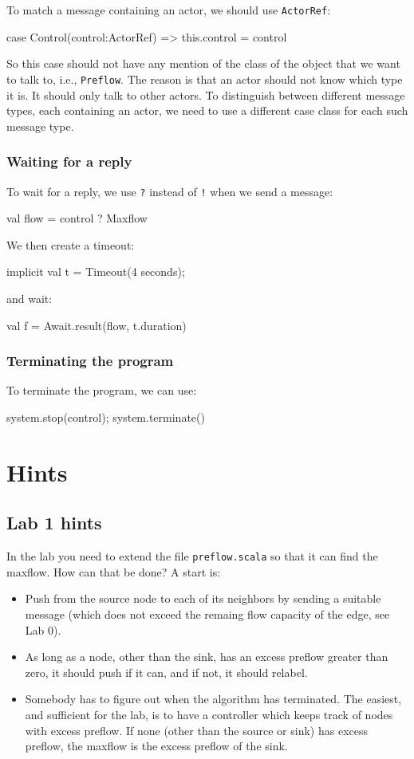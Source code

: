 \documentclass{forsete}
\begin{document}
To match a message containing an actor, we should use \verb.ActorRef.:

\begin{ccode}
case Control(control:ActorRef)	=> this.control = control
\end{ccode}
So this case should not have any mention of the class of the object that we want to talk to, i.e., {\tt Preflow}.
The reason is that an actor should not know which type it is. It should only talk to other actors.
To distinguish between different message types, each containing an actor, we need to use a 
different case class for each such message type.

\subsubsection*{Waiting for a reply}
To wait for a reply, we use \verb.?. instead of \verb.!. when we send a message:

\begin{ccode}
val flow = control ? Maxflow
\end{ccode}
We then create a timeout:
\begin{ccode}
implicit val t = Timeout(4 seconds);
\end{ccode}
and wait:
\begin{ccode}
val f = Await.result(flow, t.duration)
\end{ccode}
\subsubsection*{Terminating the program}
To terminate the program, we can use:
\begin{ccode}
system.stop(control);
system.terminate()
\end{ccode}

\section{Hints}
\subsection*{Lab 1 hints}
In the lab you need to extend the file \verb!preflow.scala! so that it can find the maxflow.
How can that be done? A start is:

\begin{itemize}
\item Push from the source node to each of its neighbors by sending a suitable message (which does not exceed
the remaing flow capacity of the edge, see Lab 0).
\item As long as a node, other than the sink, has an excess preflow greater than zero, it should 
push if it can, and if not, it should relabel.
\item Somebody has to figure out when the algorithm has terminated. The easiest, and sufficient for the lab,
is to have a controller which keeps track of nodes with excess preflow. If none (other than the source or sink)
has excess preflow, the maxflow is the excess preflow of the sink.
\end{itemize}
\end{document}
